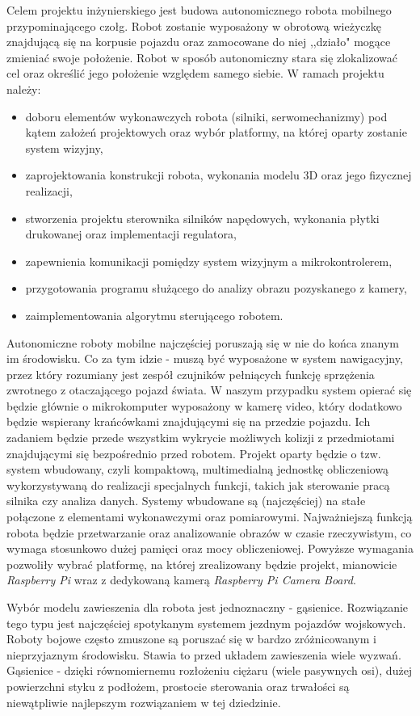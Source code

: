Celem projektu inżynierskiego jest budowa autonomicznego robota mobilnego przypominającego czołg. Robot zostanie wyposażony w obrotową wieżyczkę znajdującą się na korpusie pojazdu oraz zamocowane do niej ,,działo" mogące zmieniać swoje położenie. Robot w sposób autonomiczny stara się zlokalizować cel oraz określić jego położenie względem samego siebie. W ramach projektu należy:
\begin{itemize}
\item doboru elementów wykonawczych robota (silniki, serwomechanizmy) pod kątem założeń projektowych oraz wybór platformy, na której oparty zostanie system wizyjny,
\item zaprojektowania konstrukcji robota, wykonania modelu 3D oraz jego fizycznej realizacji,
\item stworzenia projektu sterownika silników napędowych, wykonania płytki drukowanej oraz implementacji regulatora,
\item zapewnienia komunikacji pomiędzy system wizyjnym a mikrokontrolerem,
\item przygotowania programu służącego do analizy obrazu pozyskanego z kamery,
\item zaimplementowania algorytmu sterującego robotem.
\end{itemize}

Autonomiczne roboty mobilne najczęściej poruszają się w nie do końca znanym im środowisku. Co za tym idzie - muszą być wyposażone w system nawigacyjny, przez który rozumiany jest zespół czujników pełniących funkcję sprzężenia zwrotnego z otaczającego pojazd świata. W naszym przypadku system opierać się będzie głównie o mikrokomputer wyposażony w kamerę video, który dodatkowo będzie wspierany krańcówkami znajdującymi się na przedzie pojazdu. Ich zadaniem będzie przede wszystkim wykrycie możliwych kolizji z przedmiotami znajdującymi się bezpośrednio przed robotem. Projekt oparty będzie o tzw. system wbudowany, czyli kompaktową, multimedialną jednostkę obliczeniową wykorzystywaną do realizacji specjalnych funkcji, takich jak sterowanie pracą silnika czy analiza danych. Systemy wbudowane są (najczęściej) na stałe połączone z elementami wykonawczymi oraz pomiarowymi. Najważniejszą funkcją robota będzie przetwarzanie oraz analizowanie obrazów w czasie rzeczywistym, co wymaga stosunkowo dużej pamięci oraz mocy obliczeniowej. Powyższe wymagania pozwoliły wybrać platformę, na której zrealizowany będzie projekt, mianowicie \textit{Raspberry Pi} wraz z dedykowaną kamerą \textit{Raspberry Pi Camera Board}. 

Wybór modelu zawieszenia dla robota jest jednoznaczny - gąsienice. Rozwiązanie tego typu jest najczęściej spotykanym systemem jezdnym pojazdów wojskowych. Roboty bojowe często zmuszone są poruszać się w bardzo zróżnicowanym i nieprzyjaznym środowisku. Stawia to przed układem zawieszenia wiele wyzwań.  Gąsienice - dzięki równomiernemu rozłożeniu ciężaru (wiele pasywnych osi), dużej powierzchni styku z podłożem, prostocie sterowania oraz trwałości są niewątpliwie najlepszym rozwiązaniem w tej dziedzinie.
